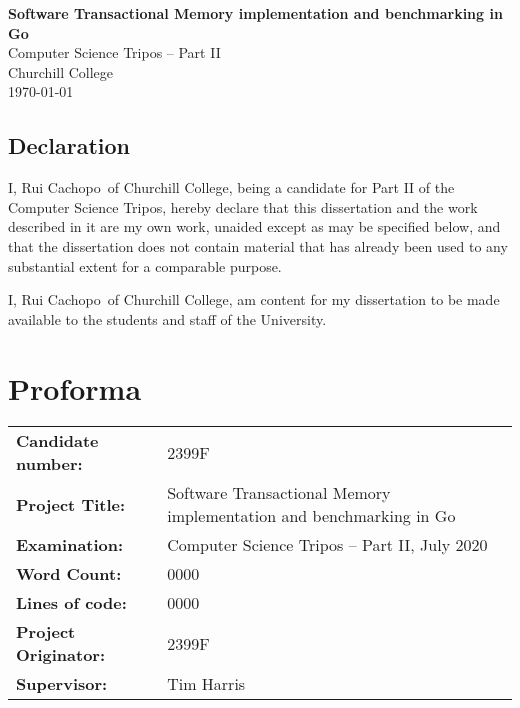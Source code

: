 \documentclass[12pt,a4paper,oneside,openright]{report}
\newcommand{\disstitle}{Software Transactional Memory implementation
  and benchmarking in Go}
\newcommand{\college}{Churchill College}
\newcommand{\studentname}{Rui Cachopo}
\newcommand{\candidatenumber}{2399F} %
\newcommand{\wordcount}{0000}
\newcommand{\loc}{0000}
\newcommand{\originator}{\candidatenumber}
\newcommand{\supervisor}{Tim Harris}
\begin{document}


\pagestyle{empty}


\rightline{\LARGE \textbf{\studentname}}

\vspace*{60mm}
\begin{center}
  \Huge
  \textbf{\disstitle} \\[5mm]
  Computer Science Tripos -- Part II \\[5mm]
  \college \\[5mm]
  \today
\end{center}

\newpage

\section*{Declaration}

I, \studentname\ of \college, being a candidate for Part II of the
Computer Science Tripos, hereby declare that this dissertation and the
work described in it are my own work, unaided except as may be
specified below, and that the dissertation does not contain material
that has already been used to any substantial extent for a comparable
purpose.

I, \studentname\ of \college, am content for my dissertation to be
made available to the students and staff of the University.

\bigskip {}

\medskip {}


\chapter*{\vspace{-1.2in} Proforma \vspace{-0.3in}}

\thispagestyle{empty}

{ \begin{tabular}{L{0.3\linewidth} L{0.7\linewidth}}
    \textbf{Candidate number:} & \candidatenumber                      \\
    \textbf{Project Title:}           & \disstitle \\
    \textbf{Examination:}        & Computer Science Tripos -- Part II, July 2020  \\
    \textbf{Word Count:}         & \wordcount  \\
    \textbf{Lines of code:} & \loc \\
    \textbf{Project Originator:} & \originator \\
    \textbf{Supervisor:} & \supervisor \\
  \end{tabular}
}
\end{document}

